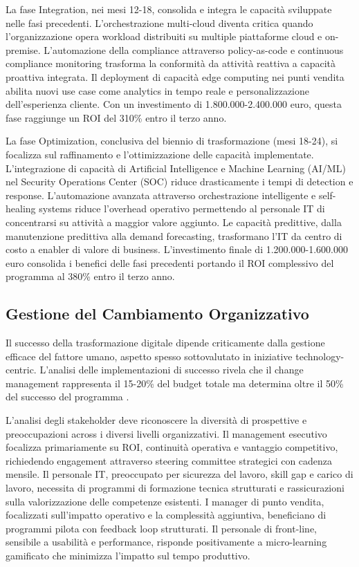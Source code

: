 La fase Integration, nei mesi 12-18, consolida e integra le capacità sviluppate nelle fasi precedenti. L'orchestrazione multi-cloud diventa critica quando l'organizzazione opera workload distribuiti su multiple piattaforme cloud e on-premise. L'automazione della compliance attraverso policy-as-code e continuous compliance monitoring trasforma la conformità da attività reattiva a capacità proattiva integrata. Il deployment di capacità edge computing nei punti vendita abilita nuovi use case come analytics in tempo reale e personalizzazione dell'esperienza cliente. Con un investimento di 1.800.000-2.400.000 euro, questa fase raggiunge un ROI del 310\% entro il terzo anno.

La fase Optimization, conclusiva del biennio di trasformazione (mesi 18-24), si focalizza sul raffinamento e l'ottimizzazione delle capacità implementate. L'integrazione di capacità di Artificial Intelligence e Machine Learning (AI/ML) nel Security Operations Center (SOC) riduce drasticamente i tempi di detection e response. L'automazione avanzata attraverso orchestrazione intelligente e self-healing systems riduce l'overhead operativo permettendo al personale IT di concentrarsi su attività a maggior valore aggiunto. Le capacità predittive, dalla manutenzione predittiva alla demand forecasting, trasformano l'IT da centro di costo a enabler di valore di business. L'investimento finale di 1.200.000-1.600.000 euro consolida i benefici delle fasi precedenti portando il ROI complessivo del programma al 380\% entro il terzo anno.

\subsection{Gestione del Cambiamento Organizzativo}

Il successo della trasformazione digitale dipende criticamente dalla gestione efficace del fattore umano, aspetto spesso sottovalutato in iniziative technology-centric. L'analisi delle implementazioni di successo rivela che il change management rappresenta il 15-20\% del budget totale ma determina oltre il 50\% del successo del programma \autocite{westerman2024leading}.

L'analisi degli stakeholder deve riconoscere la diversità di prospettive e preoccupazioni across i diversi livelli organizzativi. Il management esecutivo focalizza primariamente su ROI, continuità operativa e vantaggio competitivo, richiedendo engagement attraverso steering committee strategici con cadenza mensile. Il personale IT, preoccupato per sicurezza del lavoro, skill gap e carico di lavoro, necessita di programmi di formazione tecnica strutturati e rassicurazioni sulla valorizzazione delle competenze esistenti. I manager di punto vendita, focalizzati sull'impatto operativo e la complessità aggiuntiva, beneficiano di programmi pilota con feedback loop strutturati. Il personale di front-line, sensibile a usabilità e performance, risponde positivamente a micro-learning gamificato che minimizza l'impatto sul tempo produttivo.

